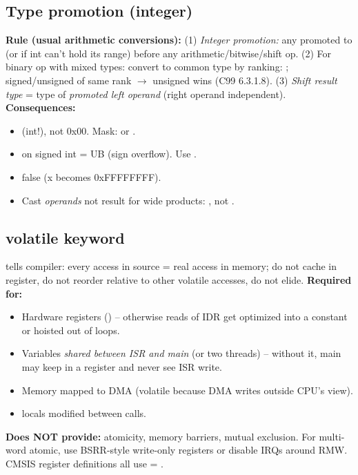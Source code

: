 \subsection{Type promotion (integer)}
\textbf{Rule (usual arithmetic conversions):}
(1) \emph{Integer promotion:} any  promoted to  (or  if int can't hold its range) before any arithmetic/bitwise/shift op.
(2) For binary op with mixed types: convert to common type by ranking: ; signed/unsigned of same rank $\to$ unsigned wins (C99 6.3.1.8).
(3) \emph{Shift result type} = type of \emph{promoted left operand} (right operand independent).
\textbf{Consequences:}
\begin{itemize}
\item {} (int!), not 0x00. Mask:  or .
\item {} on signed int = UB (sign overflow). Use .
\item {} false (x becomes 0xFFFFFFFF).
\item Cast \emph{operands} not result for wide products: , not .
\end{itemize}

\subsection{volatile keyword}
 tells compiler: every access in source = real access in memory; do not cache in register, do not reorder relative to other volatile accesses, do not elide.
\textbf{Required for:}
\begin{itemize}
\item Hardware registers () -- otherwise reads of IDR get optimized into a constant or hoisted out of loops.
\item Variables \emph{shared between ISR and main} (or two threads) -- without it, main may keep  in a register and never see ISR write.
\item Memory mapped to DMA (volatile because DMA writes outside CPU's view).
\item {} locals modified between calls.
\end{itemize}
\textbf{Does NOT provide:} atomicity, memory barriers, mutual exclusion. For multi-word atomic, use BSRR-style write-only registers or disable IRQs around RMW. CMSIS register definitions all use  = .

